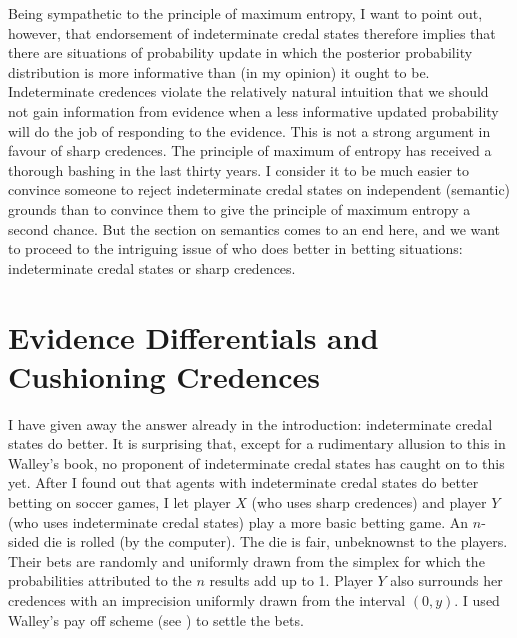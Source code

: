 Being sympathetic to the principle of maximum entropy, I want to point out, however, that endorsement of indeterminate credal states therefore implies that there are situations of probability update in which the posterior probability distribution is more informative than (in my opinion) it ought to be. Indeterminate credences violate the relatively natural intuition that we should not gain information from evidence when a less informative updated probability will do the job of responding to the evidence. This is not a strong argument in favour of sharp credences. The principle of maximum of entropy has received a thorough bashing in the last thirty years. I consider it to be much easier to convince someone to reject indeterminate credal states on independent (semantic) grounds than to convince them to give the principle of maximum entropy a second chance. But the section on semantics comes to an end here, and we want to proceed to the intriguing issue of who does better in betting situations: indeterminate credal states or sharp credences.

\section{Evidence Differentials and Cushioning Credences}
\label{WalleysWorldCupWoes}

I have given away the answer already in the introduction: indeterminate credal states do better. It is surprising that, except for a rudimentary allusion to this in Walley's book, no proponent of indeterminate credal states has caught on to this yet. After I found out that agents with indeterminate credal states do better betting on soccer games, I let player $X$ (who uses sharp credences) and player $Y$ (who uses indeterminate credal states) play a more basic betting game. An $n$-sided die is rolled (by the computer). The die is fair, unbeknownst to the players. Their bets are randomly and uniformly drawn from the simplex for which the probabilities attributed to the $n$ results add up to 1. Player $Y$ also surrounds her credences with an imprecision uniformly drawn from the interval $(0,y)$. I used Walley's pay off scheme (see ) to settle the bets.

